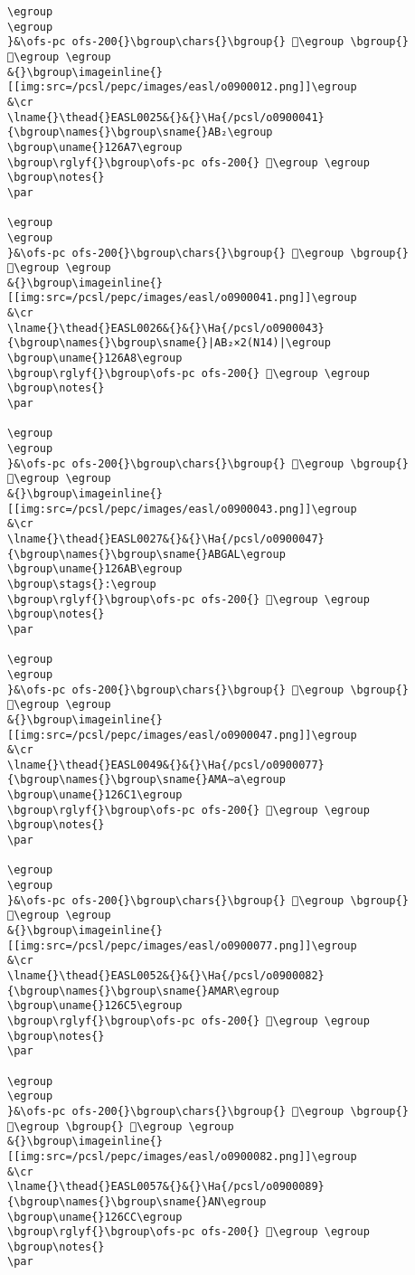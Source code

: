 \begin{verbatim}
\egroup
\egroup
}&\ofs-pc ofs-200{}\bgroup\chars{}\bgroup{} 𒚢\egroup \bgroup{} 𒚘\egroup \egroup
&{}\bgroup\imageinline{}[[img:src=/pcsl/pepc/images/easl/o0900012.png]]\egroup
&\cr
\lname{}\thead{}EASL0025&{}&{}\Ha{/pcsl/o0900041}{\bgroup\names{}\bgroup\sname{}AB₂\egroup
\bgroup\uname{}126A7\egroup
\bgroup\rglyf{}\bgroup\ofs-pc ofs-200{} 𒚧\egroup \egroup
\bgroup\notes{}
\par 

\egroup
\egroup
}&\ofs-pc ofs-200{}\bgroup\chars{}\bgroup{} 𒚧\egroup \bgroup{} 𒚩\egroup \egroup
&{}\bgroup\imageinline{}[[img:src=/pcsl/pepc/images/easl/o0900041.png]]\egroup
&\cr
\lname{}\thead{}EASL0026&{}&{}\Ha{/pcsl/o0900043}{\bgroup\names{}\bgroup\sname{}|AB₂×2(N14)|\egroup
\bgroup\uname{}126A8\egroup
\bgroup\rglyf{}\bgroup\ofs-pc ofs-200{} 𒚨\egroup \egroup
\bgroup\notes{}
\par 

\egroup
\egroup
}&\ofs-pc ofs-200{}\bgroup\chars{}\bgroup{} 𒚪\egroup \bgroup{} 𒚨\egroup \egroup
&{}\bgroup\imageinline{}[[img:src=/pcsl/pepc/images/easl/o0900043.png]]\egroup
&\cr
\lname{}\thead{}EASL0027&{}&{}\Ha{/pcsl/o0900047}{\bgroup\names{}\bgroup\sname{}ABGAL\egroup
\bgroup\uname{}126AB\egroup
\bgroup\stags{}:\egroup
\bgroup\rglyf{}\bgroup\ofs-pc ofs-200{} 𒚫\egroup \egroup
\bgroup\notes{}
\par 

\egroup
\egroup
}&\ofs-pc ofs-200{}\bgroup\chars{}\bgroup{} 𒚫\egroup \bgroup{} 𒚬\egroup \egroup
&{}\bgroup\imageinline{}[[img:src=/pcsl/pepc/images/easl/o0900047.png]]\egroup
&\cr
\lname{}\thead{}EASL0049&{}&{}\Ha{/pcsl/o0900077}{\bgroup\names{}\bgroup\sname{}AMA∼a\egroup
\bgroup\uname{}126C1\egroup
\bgroup\rglyf{}\bgroup\ofs-pc ofs-200{} 𒛁\egroup \egroup
\bgroup\notes{}
\par 

\egroup
\egroup
}&\ofs-pc ofs-200{}\bgroup\chars{}\bgroup{} 𒛁\egroup \bgroup{} 𒛃\egroup \egroup
&{}\bgroup\imageinline{}[[img:src=/pcsl/pepc/images/easl/o0900077.png]]\egroup
&\cr
\lname{}\thead{}EASL0052&{}&{}\Ha{/pcsl/o0900082}{\bgroup\names{}\bgroup\sname{}AMAR\egroup
\bgroup\uname{}126C5\egroup
\bgroup\rglyf{}\bgroup\ofs-pc ofs-200{} 𒛅\egroup \egroup
\bgroup\notes{}
\par 

\egroup
\egroup
}&\ofs-pc ofs-200{}\bgroup\chars{}\bgroup{} 𒛊\egroup \bgroup{} 𒛅\egroup \bgroup{} 𒛉\egroup \egroup
&{}\bgroup\imageinline{}[[img:src=/pcsl/pepc/images/easl/o0900082.png]]\egroup
&\cr
\lname{}\thead{}EASL0057&{}&{}\Ha{/pcsl/o0900089}{\bgroup\names{}\bgroup\sname{}AN\egroup
\bgroup\uname{}126CC\egroup
\bgroup\rglyf{}\bgroup\ofs-pc ofs-200{} 𒛌\egroup \egroup
\bgroup\notes{}
\par 


\end{verbatim}
